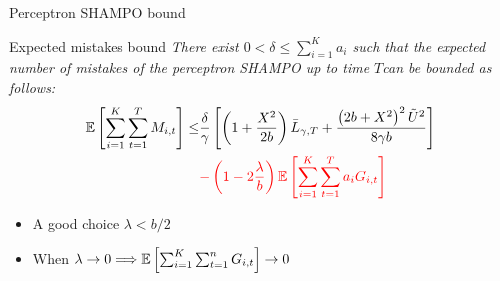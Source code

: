 \documentclass{beamer}
\begin{document}
\begin{frame}{Perceptron SHAMPO   bound }
\begin{block}{Expected mistakes bound}
\emph{There exist $0<\delta\le\sum_{i=1}^Ka_{i  }$ such that the expected  number of mistakes  of the  perceptron SHAMPO  up to time $T$can be bounded as follows:}
\begin{displaymath}
\begin{split}
\mathbb{E}\left[ \sum_{i=1}^{K}\sum_{t=1}^{T}{M_{i,t}} \right]
\le& \frac{\delta}{\gamma}\left[{\left(1+\frac{X^2}{2b} \right){\bar L}_{\gamma,T}+
\frac{\left({2b+X^2}\right)^2\tilde{U}^2}{8{\gamma}b}}\right]\\
&\textcolor{red}{-\left({1-2\frac{\lambda}{b}}\right)\mathbb{E}\left[{\sum_{i=1}^{K}\sum_{t=1}^{T}{a_iG_{i,t}}}\right]}~
\end{split}
\end{displaymath}
\end{block}
\begin{itemize}
\item A good choice $\lambda<b/2 $\newline
\item When $\lambda\rightarrow0\Longrightarrow\mathbb{E}\left[{\sum_{i=1}^{K}\sum_{t=1}^{n}{G_{i,t}}}\right]\rightarrow0$
\end{itemize}
\end{frame}
\end{document}
